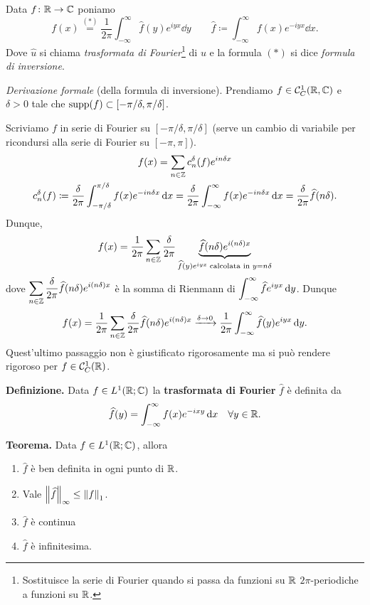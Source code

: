 Data $f \colon \mathbb R \to \mathbb C$ poniamo
%
$$
	f(x) \overset{(\ast)}{=} \frac{1}{2\pi} \int_{-\infty}^\infty \hat{f}(y) e^{iyx} \dd y 
	\qquad \hat{f} \coloneqq \int_{-\infty}^\infty f(x) e^{-iyx} \dd x.
$$
%
Dove $\hat{u}$ si chiama \textit{trasformata di Fourier}\footnote{Sostituisce la serie di Fourier quando si passa da funzioni su $\mathbb R$ $2\pi$-periodiche a funzioni su $\mathbb R$.} di $u$ e la formula $(\ast)$ si dice \textit{formula di inversione}.

\textit{Derivazione formale} (della formula di inversione).
Prendiamo $f \in \mathcal{C}_C^1(\mathbb R,\mathbb C)$ e $\delta > 0$ tale che $\operatorname{supp}(f) \subset [-\pi / \delta, \pi / \delta]$. 

Scriviamo $f$ in serie di Fourier su $[-\pi / \delta, \pi / \delta]$ (serve un cambio di variabile per ricondursi alla serie di Fourier su $[-\pi,\pi]$).
%
\begin{gather*}
	f(x) = \sum_{n \in \mathbb Z} c_n^\delta (f) e^{in \delta x} \\
	c_n^\delta (f) \coloneqq \frac{\delta}{2\pi} \int_{-\pi / \delta}^{\pi / \delta} f(x) e^{-in \delta x} \,\mathrm{d} x
	= \frac{\delta}{2\pi} \int_{-\infty}^\infty f(x) e^{-in \delta x} \,\mathrm{d} x
	= \frac{\delta}{2\pi} \widehat{f}(n\delta).
\end{gather*}
Dunque,
%
$$
	f(x) = \frac{1}{2\pi} \sum_{n \in \mathbb Z} \frac{\delta}{2\pi} \underbrace{\widehat{f}(n\delta) e^{i(n\delta)x}}_{\widehat{f}(y) e^{iyx} \; \text{calcolata in } y = n\delta}
$$
%
dove $\displaystyle \sum_{n \in \mathbb Z} \frac{\delta}{2\pi}\widehat{f}(n\delta) e^{i(n\delta)x} $ è la somma di Rienmann di $\displaystyle \int_{-\infty}^{\infty} \widehat{f} e^{iyx} \,\mathrm{d} y$.
Dunque
%
$$
	f(x) = \frac{1}{2\pi} \sum_{n \in \mathbb Z} \frac{\delta}{2\pi} \widehat{f}(n\delta) e^{i(n\delta)x}
	\xrightarrow{\delta \to 0}
	\frac{1}{2\pi} \int_{-\infty}^{\infty} \widehat{f}(y) e^{iyx} \,\mathrm{d} y.
$$
%
Quest'ultimo passaggio non è giustificato rigorosamente ma si può rendere rigoroso per $f \in \mathcal{C}_C^1(\mathbb R)$.

\vss

\textbf{Definizione.} Data $f \in L^1(\mathbb R; \mathbb C)$ la \textbf{trasformata di Fourier} $\hat{f}$ è definita da
%
$$
	\widehat{f}(y) = \int_{-\infty}^\infty f(x) e^{-ixy} \,\mathrm{d} x \quad \forall y \in \mathbb R.
$$
%

\textbf{Teorema.} Data $f \in L^1(\mathbb R;\mathbb C)$, allora
\begin{enumerate}

	\item $\hat{f}$ è ben definita in ogni punto di $\mathbb R$.

	\item Vale $\left\lVert \widehat{f} \right\rVert_\infty \leq \left\lVert f \right\rVert_1$.

	\item $\hat{f}$ è continua

	\item $\hat{f}$ è infinitesima.

\end{enumerate}

